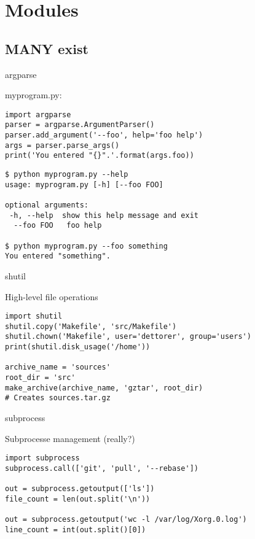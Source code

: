 \documentclass[ignorenonframetext,]{beamer}
\begin{document}
\section{Modules}
\subsection{MANY exist}

\begin{frame}[fragile]{argparse}

    myprogram.py:
    \begin{tcolorbox}
    \begin{verbatim}
import argparse
parser = argparse.ArgumentParser()
parser.add_argument('--foo', help='foo help')
args = parser.parse_args()
print('You entered "{}".'.format(args.foo))
    \end{verbatim}
    \end{tcolorbox}

    \begin{tcolorbox}
        \begin{Verbatim}[fontsize=\small]
$ python myprogram.py --help
usage: myprogram.py [-h] [--foo FOO]

optional arguments:
 -h, --help  show this help message and exit
  --foo FOO   foo help

$ python myprogram.py --foo something
You entered "something".
        \end{Verbatim}
    \end{tcolorbox}
\end{frame}

\begin{frame}[fragile]{shutil}

    High-level file operations

    \begin{tcolorbox}
    \begin{verbatim}
import shutil
shutil.copy('Makefile', 'src/Makefile')
shutil.chown('Makefile', user='dettorer', group='users')
print(shutil.disk_usage('/home'))

archive_name = 'sources'
root_dir = 'src'
make_archive(archive_name, 'gztar', root_dir)
# Creates sources.tar.gz
    \end{verbatim}
    \end{tcolorbox}
\end{frame}

\begin{frame}[fragile]{subprocess}

    Subprocesse management (really?)

    \begin{tcolorbox}
    \begin{verbatim}
import subprocess
subprocess.call(['git', 'pull', '--rebase'])

out = subprocess.getoutput(['ls'])
file_count = len(out.split('\n'))

out = subprocess.getoutput('wc -l /var/log/Xorg.0.log')
line_count = int(out.split()[0])
    \end{verbatim}
    \end{tcolorbox}
\end{frame}
\end{document}
